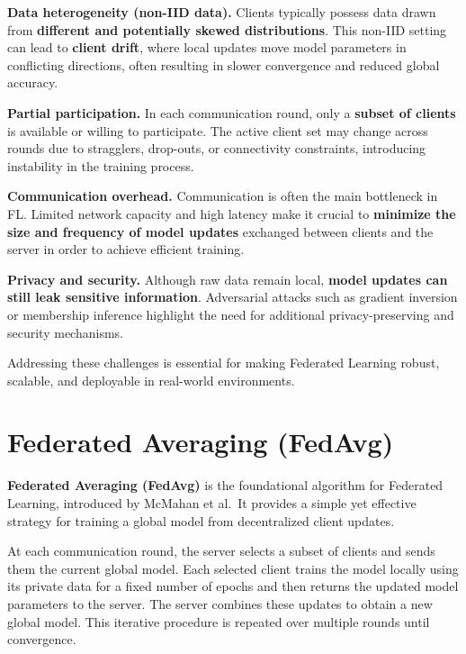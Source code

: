 \begin{compactitemize}
    \item \textbf{Data heterogeneity (non-IID data).}  
    Clients typically possess data drawn from \textbf{different and potentially skewed
    distributions}. This non-IID setting can lead to \textbf{client drift}, where local
    updates move model parameters in conflicting directions, often resulting in slower
    convergence and reduced global accuracy.

    \item \textbf{Partial participation.}  
    In each communication round, only a \textbf{subset of clients} is available or willing
    to participate. The active client set may change across rounds due to stragglers,
    drop-outs, or connectivity constraints, introducing instability in the training
    process.

    \item \textbf{Communication overhead.}  
    Communication is often the main bottleneck in FL. Limited network capacity and high
    latency make it crucial to \textbf{minimize the size and frequency of model updates}
    exchanged between clients and the server in order to achieve efficient training.

    \item \textbf{Privacy and security.}  
    Although raw data remain local, \textbf{model updates can still leak sensitive
    information}. Adversarial attacks such as gradient inversion or membership inference
    highlight the need for additional privacy-preserving and security mechanisms.
\end{compactitemize}

Addressing these challenges is essential for making Federated Learning robust, scalable,
and deployable in real-world environments.

\section{Federated Averaging (FedAvg)}

\textbf{Federated Averaging (FedAvg)} is the foundational algorithm for Federated Learning,
introduced by McMahan et al.\ It provides a simple yet effective strategy for training a
global model from decentralized client updates.

At each communication round, the server selects a subset of clients and sends them the
current global model. Each selected client trains the model locally using its private data
for a fixed number of epochs and then returns the updated model parameters to the server.
The server combines these updates to obtain a new global model. This iterative procedure
is repeated over multiple rounds until convergence.

